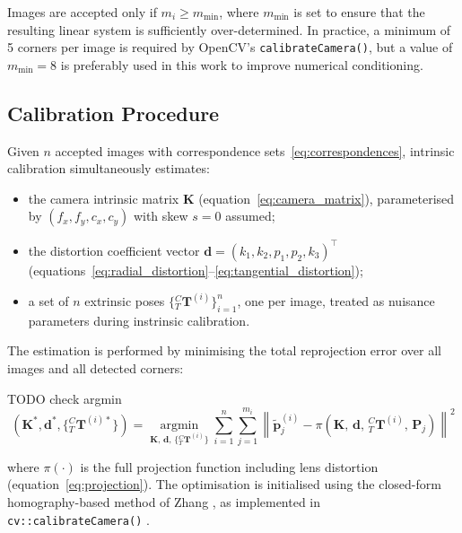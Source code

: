 Images are accepted only if $m_i \geq m_{\min}$, where $m_{\min}$ is set
to ensure that the resulting linear system is sufficiently over-determined.
In practice, a minimum of 5 corners per image is required by OpenCV's
\texttt{calibrateCamera()}, but a value of $m_{\min} = 8$ is preferably used in this
work to improve numerical conditioning.

\subsection{Calibration Procedure}
\label{subsec:intr_procedure}

Given $n$ accepted images with correspondence sets~\eqref{eq:correspondences},
intrinsic calibration simultaneously estimates:

\begin{itemize}
    \item the camera intrinsic matrix $\mathbf{K}$ (equation~\eqref{eq:camera_matrix}),
    parameterised by $(f_x, f_y, c_x, c_y)$ with skew $s = 0$ assumed;
    \item the distortion coefficient vector
    $\mathbf{d} = (k_1, k_2, p_1, p_2, k_3)^{\top}$
    (equations~\eqref{eq:radial_distortion}--\eqref{eq:tangential_distortion});
    \item a set of $n$ extrinsic poses
    $\{{}^C_T\mathbf{T}^{(i)}\}_{i=1}^n$, one per image, treated as nuisance
    parameters during instrinsic calibration.
\end{itemize}
\noindent The estimation is performed by minimising the total reprojection
error over all images and all detected corners:

TODO check argmin
\begin{equation}
    \left(\mathbf{K}^*, \mathbf{d}^*, \{{}^C_T\mathbf{T}^{(i)*}\}\right) =
    \operatorname*{arg\min}_{\mathbf{K},\, \mathbf{d},\, \{{}^C_T\mathbf{T}^{(i)}\}}
    \sum_{i=1}^{n} \sum_{j=1}^{m_i}
    \left\lVert
        \tilde{\mathbf{p}}_j^{(i)} -
        \pi\!\left(\mathbf{K},\, \mathbf{d},\,
        {}^C_T\mathbf{T}^{(i)},\, \mathbf{P}_j\right)
    \right\rVert^2
    \label{eq:calib_optim}
\end{equation}

\noindent where $\pi(\cdot)$ is the full projection function including lens
distortion (equation~\eqref{eq:projection}). The optimisation is initialised
using the closed-form homography-based method of Zhang \cite{zhang2000flexible}, as implemented
in \texttt{cv::calibrateCamera()} \cite{bradski2008learning}.

